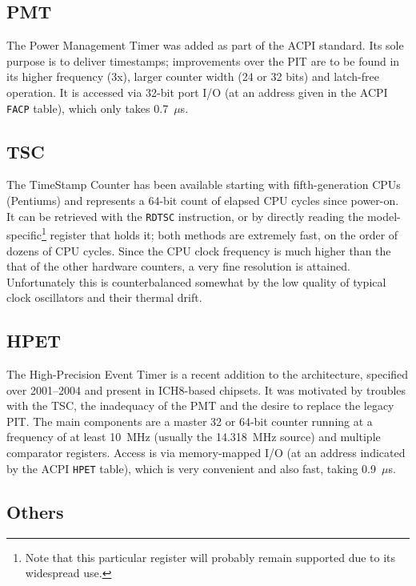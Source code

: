 \documentclass[a4paper,12pt,pdftex]{article}
\newcommand{\id}[1]{\texttt{#1}}
\begin{document}
\subsection{PMT}

The Power Management Timer was added as part of the ACPI standard. Its sole purpose is to deliver timestamps; improvements over the PIT are to be found in its higher frequency (3x), larger counter width (24 or 32 bits) and latch-free operation. It is accessed via 32-bit port I/O (at an address given in the ACPI \id{FACP} table), which only takes 0.7~$\mu$s.

\subsection{TSC}

The TimeStamp Counter has been available starting with fifth-generation CPUs (Pentiums) and represents a 64-bit count of elapsed CPU cycles since power-on. It can be retrieved with the \id{RDTSC} instruction, or by directly reading the model-specific\footnote{Note that this particular register will probably remain supported due to its widespread use.} register that holds it; both methods are extremely fast, on the order of dozens of CPU cycles. Since the CPU clock frequency is much higher than the that of the other hardware counters, a very fine resolution is attained. Unfortunately this is counterbalanced somewhat by the low quality of typical clock oscillators and their thermal drift.

\subsection{HPET}

The High-Precision Event Timer is a recent addition to the architecture, specified over 2001--2004 and present in ICH8-based chipsets. It was motivated by troubles with the TSC, the inadequacy of the PMT and the desire to replace the legacy PIT. The main components are a master 32 or 64-bit counter running at a frequency of at least 10~MHz (usually the 14.318~MHz source) and multiple comparator registers. Access is via memory-mapped I/O (at an address indicated by the ACPI \id{HPET} table), which is very convenient and also fast, taking 0.9~$\mu$s.

\subsection{Others}
\end{document}
